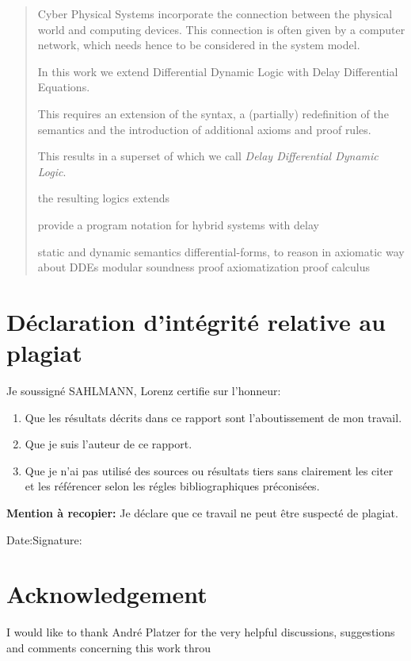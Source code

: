 \begin{abstract}
    Cyber Physical Systems incorporate the connection between the physical world and computing devices.
    This connection is often given by a computer network, which needs hence to be considered in the system model.

    In this work we extend Differential Dynamic Logic with Delay Differential Equations.

    This requires an extension of the syntax, a (partially) redefinition of the semantics and the introduction of additional axioms and proof rules.

    This results in a superset of \dL which we call \emph{Delay Differential Dynamic Logic}.

    the resulting logics extends

    provide a program notation for hybrid systems with delay

    static and dynamic semantics
    differential-forms, to reason in axiomatic way about DDEs
    modular soundness proof
    axiomatization
    proof calculus
\end{abstract}

\begin{otherlanguage}{frenchb}
    \chapter*{Déclaration d’intégrité relative au plagiat}

    Je soussigné SAHLMANN, Lorenz certifie sur l’honneur:
    \begin{enumerate}
        \item Que les résultats décrits dans ce rapport sont l’aboutissement de mon travail.
        \item Que je suis l’auteur de ce rapport.
        \item Que je n’ai pas utilisé des sources ou résultats tiers sans clairement les citer et les référencer selon les régles bibliographiques préconisées.
    \end{enumerate}

    \textbf{Mention à recopier:}
    Je déclare que ce travail ne peut être suspecté de plagiat.

    \vspace{2cm}
    Date:\hfil Signature:

\end{otherlanguage}

\cleardoublepage

\chapter*{Acknowledgement}
    I would like to thank André Platzer for the very helpful discussions, suggestions and comments concerning this work throu
